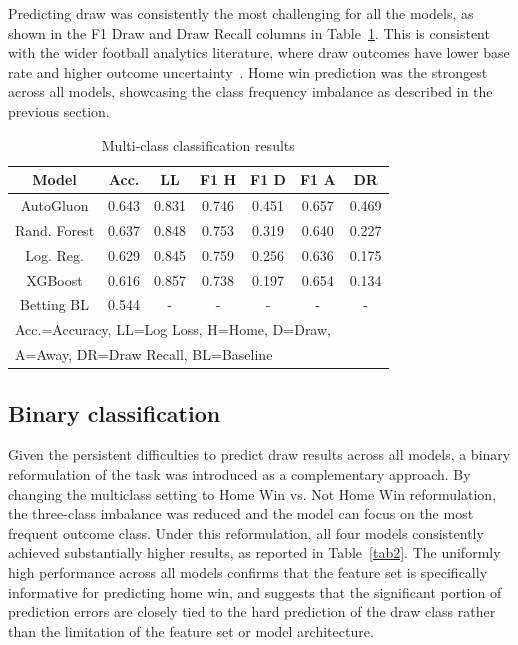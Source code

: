 \documentclass[conference]{IEEEtran}
\begin{document}
Predicting draw was consistently the most challenging for all
the models, as shown in the F1 Draw and Draw Recall columns in
Table~\ref{tab1}. This is consistent with the wider football
analytics literature, where draw outcomes have lower base rate
and higher outcome uncertainty~\cite{b7}\cite{b9}. Home win
prediction was the strongest across all models, showcasing the
class frequency imbalance as described in the previous section.

\begin{table}[htbp]
\caption{Multi-class classification results}
\begin{center}
\begin{tabular}{|c|c|c|c|c|c|c|}
\hline
\textbf{Model} & \textbf{Acc.} & \textbf{LL} &
\textbf{F1 H} & \textbf{F1 D} & \textbf{F1 A} &
\textbf{DR} \\
\hline
AutoGluon & 0.643 & 0.831 & 0.746 & 0.451 & 0.657 & 0.469 \\
\hline
Rand. Forest & 0.637 & 0.848 & 0.753 & 0.319 & 0.640 & 0.227 \\
\hline
Log. Reg. & 0.629 & 0.845 & 0.759 & 0.256 & 0.636 & 0.175 \\
\hline
XGBoost & 0.616 & 0.857 & 0.738 & 0.197 & 0.654 & 0.134 \\
\hline
Betting BL & 0.544 & - & - & - & - & - \\
\hline
\multicolumn{7}{l}{Acc.=Accuracy, LL=Log Loss, H=Home, D=Draw,} \\
\multicolumn{7}{l}{A=Away, DR=Draw Recall, BL=Baseline}
\end{tabular}
\label{tab1}
\end{center}
\end{table}

\subsection{Binary classification}
Given the persistent difficulties to predict draw results across
all models, a binary reformulation of the task was introduced
as a complementary approach. By changing the multiclass setting
to Home Win vs. Not Home Win reformulation, the three-class
imbalance was reduced and the model can focus on the most
frequent outcome class. Under this reformulation, all four
models consistently achieved substantially higher results, as
reported in Table~\ref{tab2}. The uniformly high performance
across all models confirms that the feature set is specifically
informative for predicting home win, and suggests that the
significant portion of prediction errors are closely tied to
the hard prediction of the draw class rather than the limitation
of the feature set or model architecture.
\end{document}
